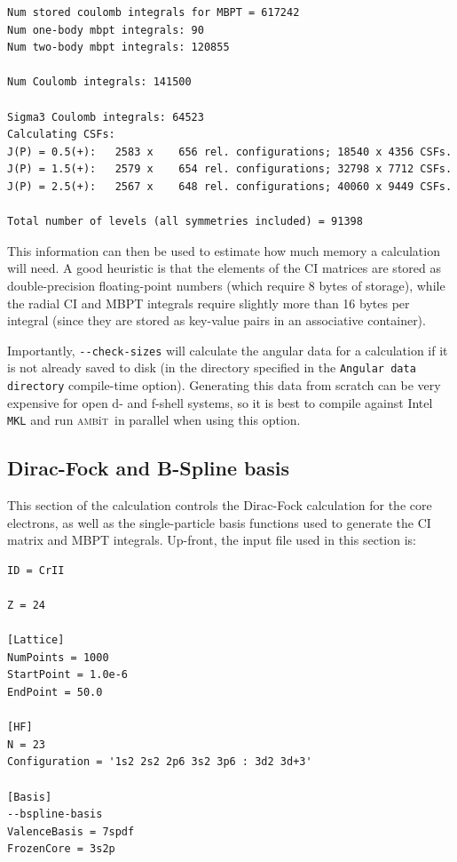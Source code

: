 \documentclass{report}
\newcommand{\ambit}{\textsc{amb}{\footnotesize i}\textsc{t}}
\begin{document}
\begin{verbatim}
Num stored coulomb integrals for MBPT = 617242
Num one-body mbpt integrals: 90
Num two-body mbpt integrals: 120855

Num Coulomb integrals: 141500

Sigma3 Coulomb integrals: 64523
Calculating CSFs: 
J(P) = 0.5(+):   2583 x    656 rel. configurations; 18540 x 4356 CSFs.
J(P) = 1.5(+):   2579 x    654 rel. configurations; 32798 x 7712 CSFs.
J(P) = 2.5(+):   2567 x    648 rel. configurations; 40060 x 9449 CSFs.

Total number of levels (all symmetries included) = 91398
\end{verbatim}

This information can then be used to estimate how much memory a calculation will need. A good heuristic
is that the elements of the CI matrices are stored as double-precision floating-point numbers
(which require 8 bytes of storage), while the radial CI and MBPT integrals require
slightly more than 16 bytes per integral (since they are stored as key-value pairs in an associative
container).

Importantly, \texttt{{-}{-}check-sizes} will calculate the angular data for a calculation if it is not
already saved to disk (in the directory specified in the \texttt{Angular data directory} compile-time
option). Generating this data from scratch can be very expensive for open d- and f-shell systems, so it
is best to compile against Intel \texttt{MKL} and run \ambit\  in parallel when using this option.

\subsection{Dirac-Fock and B-Spline basis}
\label{sec:tut_DF}

This section of the calculation controls the Dirac-Fock calculation for the core electrons, as well as
the single-particle basis functions used to generate the CI matrix and MBPT integrals. Up-front, the 
input file used in this section is:

\begin{verbatim}
ID = CrII

Z = 24

[Lattice]
NumPoints = 1000
StartPoint = 1.0e-6
EndPoint = 50.0

[HF]
N = 23
Configuration = '1s2 2s2 2p6 3s2 3p6 : 3d2 3d+3'

[Basis]
--bspline-basis
ValenceBasis = 7spdf
FrozenCore = 3s2p
\end{verbatim}
\end{document}
